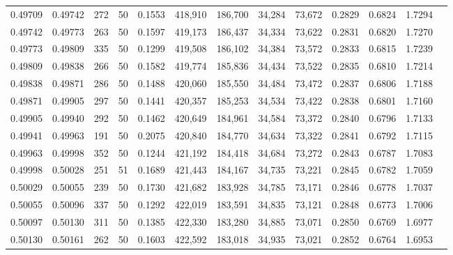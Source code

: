 \begin{tabular}{rrrrrrrrrrrrr}
0.49709 & 0.49742 &   272 &  50 &                                     0.1553 & 418,910 & 186,700 &  34,284 &  73,672 & 0.2829 & 0.6824 & 1.7294 \\
0.49742 & 0.49773 &   263 &  50 &                                     0.1597 & 419,173 & 186,437 &  34,334 &  73,622 & 0.2831 & 0.6820 & 1.7270 \\
0.49773 & 0.49809 &   335 &  50 &                                     0.1299 & 419,508 & 186,102 &  34,384 &  73,572 & 0.2833 & 0.6815 & 1.7239 \\
0.49809 & 0.49838 &   266 &  50 &                                     0.1582 & 419,774 & 185,836 &  34,434 &  73,522 & 0.2835 & 0.6810 & 1.7214 \\
0.49838 & 0.49871 &   286 &  50 &                                     0.1488 & 420,060 & 185,550 &  34,484 &  73,472 & 0.2837 & 0.6806 & 1.7188 \\
0.49871 & 0.49905 &   297 &  50 &                                     0.1441 & 420,357 & 185,253 &  34,534 &  73,422 & 0.2838 & 0.6801 & 1.7160 \\
0.49905 & 0.49940 &   292 &  50 &                                     0.1462 & 420,649 & 184,961 &  34,584 &  73,372 & 0.2840 & 0.6796 & 1.7133 \\
0.49941 & 0.49963 &   191 &  50 &                                     0.2075 & 420,840 & 184,770 &  34,634 &  73,322 & 0.2841 & 0.6792 & 1.7115 \\
0.49963 & 0.49998 &   352 &  50 &                                     0.1244 & 421,192 & 184,418 &  34,684 &  73,272 & 0.2843 & 0.6787 & 1.7083 \\
0.49998 & 0.50028 &   251 &  51 &                                     0.1689 & 421,443 & 184,167 &  34,735 &  73,221 & 0.2845 & 0.6782 & 1.7059 \\
0.50029 & 0.50055 &   239 &  50 &                                     0.1730 & 421,682 & 183,928 &  34,785 &  73,171 & 0.2846 & 0.6778 & 1.7037 \\
0.50055 & 0.50096 &   337 &  50 &                                     0.1292 & 422,019 & 183,591 &  34,835 &  73,121 & 0.2848 & 0.6773 & 1.7006 \\
0.50097 & 0.50130 &   311 &  50 &                                     0.1385 & 422,330 & 183,280 &  34,885 &  73,071 & 0.2850 & 0.6769 & 1.6977 \\
0.50130 & 0.50161 &   262 &  50 &                                     0.1603 & 422,592 & 183,018 &  34,935 &  73,021 & 0.2852 & 0.6764 & 1.6953 \\

\end{tabular}
